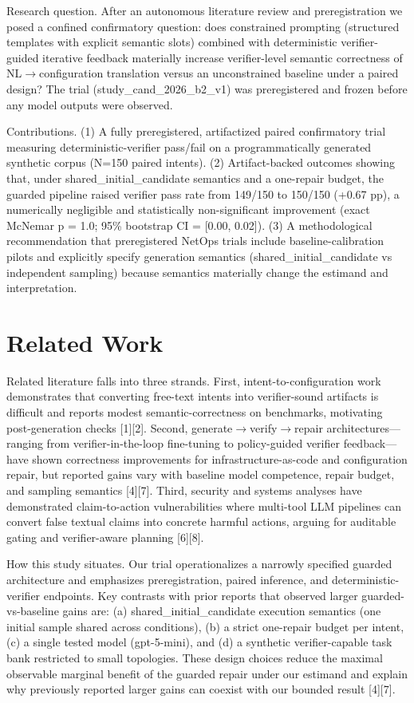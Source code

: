 \documentclass[conference]{IEEEtran}
\begin{document}
Research question. After an autonomous literature review and preregistration we posed a confined confirmatory question: does constrained prompting (structured templates with explicit semantic slots) combined with deterministic verifier-guided iterative feedback materially increase verifier-level semantic correctness of NL\ensuremath{\rightarrow}configuration translation versus an unconstrained baseline under a paired design? The trial (study\_cand\_2026\_b2\_v1) was preregistered and frozen before any model outputs were observed.

Contributions. (1) A fully preregistered, artifactized paired confirmatory trial measuring deterministic-verifier pass/fail on a programmatically generated synthetic corpus (N=150 paired intents). (2) Artifact-backed outcomes showing that, under shared\_initial\_candidate semantics and a one-repair budget, the guarded pipeline raised verifier pass rate from 149/150 to 150/150 (+0.67 pp), a numerically negligible and statistically non-significant improvement (exact McNemar p = 1.0; 95\% bootstrap CI = [0.00, 0.02]). (3) A methodological recommendation that preregistered NetOps trials include baseline-calibration pilots and explicitly specify generation semantics (shared\_initial\_candidate vs independent sampling) because semantics materially change the estimand and interpretation.

\section{Related Work}
Related literature falls into three strands. First, intent-to-configuration work demonstrates that converting free-text intents into verifier-sound artifacts is difficult and reports modest semantic-correctness on benchmarks, motivating post-generation checks [1][2]. Second, generate\ensuremath{\rightarrow}verify\ensuremath{\rightarrow}repair architectures---ranging from verifier-in-the-loop fine-tuning to policy-guided verifier feedback---have shown correctness improvements for infrastructure-as-code and configuration repair, but reported gains vary with baseline model competence, repair budget, and sampling semantics [4][7]. Third, security and systems analyses have demonstrated claim-to-action vulnerabilities where multi-tool LLM pipelines can convert false textual claims into concrete harmful actions, arguing for auditable gating and verifier-aware planning [6][8].

How this study situates. Our trial operationalizes a narrowly specified guarded architecture and emphasizes preregistration, paired inference, and deterministic-verifier endpoints. Key contrasts with prior reports that observed larger guarded-vs-baseline gains are: (a) shared\_initial\_candidate execution semantics (one initial sample shared across conditions), (b) a strict one-repair budget per intent, (c) a single tested model (gpt-5-mini), and (d) a synthetic verifier-capable task bank restricted to small topologies. These design choices reduce the maximal observable marginal benefit of the guarded repair under our estimand and explain why previously reported larger gains can coexist with our bounded result [4][7].
\end{document}
